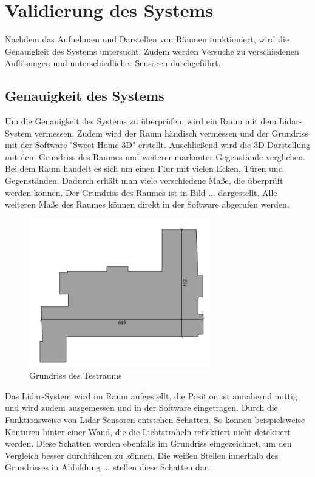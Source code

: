 

\chapter{Validierung des Systems}

Nachdem das Aufnehmen und Darstellen von Räumen funktioniert, wird die Genauigkeit des Systems untersucht. Zudem werden Versuche zu verschiedenen Auflösungen und unterschiedlicher Sensoren durchgeführt.  


\section{Genauigkeit des Systems}

Um die Genauigkeit des Systems zu überprüfen, wird ein Raum mit dem Lidar-System vermessen. Zudem wird der Raum händisch vermessen und der Grundriss mit der Software "Sweet Home 3D" erstellt. Anschließend wird die 3D-Darstellung mit dem Grundriss des Raumes und weiterer markanter Gegenstände verglichen.
Bei dem Raum handelt es sich um einen Flur mit vielen Ecken, Türen und Gegenständen. Dadurch erhält man viele verschiedene Maße, die überprüft werden können. Der Grundriss des Raumes ist in Bild ... dargestellt. Alle weiteren Maße des Raumes können direkt in der Software abgerufen werden.

\begin{figure}[H]
	\centering
	\includegraphics[width=0.7\textwidth]{images/Validierung/Grundriss}
	\caption{Grundriss des Testraums}
	\label{grundriss}
\end{figure}


Das Lidar-System wird im Raum aufgestellt, die Position ist annähernd mittig und wird zudem ausgemessen und in der Software eingetragen. Durch die Funktionsweise von Lidar Sensoren entstehen Schatten. So können beispielsweise Konturen hinter einer Wand, die die Lichtstraheln reflektiert nicht detektiert werden. Diese Schatten werden ebenfalls im Grundriss eingezeichnet, um den Vergleich besser durchführen zu können. Die weißen Stellen innerhalb des Grundrisses in Abbildung ... stellen diese Schatten dar.

